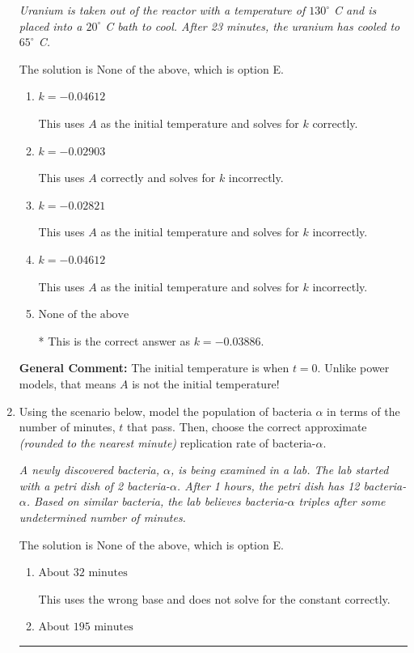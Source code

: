 \documentclass{extbook}[14pt]
\newcommand{\litem}[1]{\item #1

\rule{\textwidth}{0.4pt}}
\begin{document}
\begin{enumerate}
{\begin{center}
    \textit{ Uranium is taken out of the reactor with a temperature of $130^{\circ}$ C and is placed into a $20^{\circ}$ C bath to cool. After 23 minutes, the uranium has cooled to $65^{\circ}$ C. }
\end{center}


The solution is \( \text{None of the above} \), which is option E.\begin{enumerate}[label=\Alph*.]
\item \( k = -0.04612 \)

This uses $A$ as the initial temperature and solves for $k$ correctly.
\item \( k = -0.02903 \)

This uses $A$ correctly and solves for $k$ incorrectly.
\item \( k = -0.02821 \)

This uses $A$ as the initial temperature and solves for $k$ incorrectly.
\item \( k = -0.04612 \)

This uses $A$ as the initial temperature and solves for $k$ incorrectly.
\item \( \text{None of the above} \)

* This is the correct answer as $k = -0.03886$.
\end{enumerate}

\textbf{General Comment:} The initial temperature is when $t = 0$. Unlike power models, that means $A$ is not the initial temperature!
}
\litem{
Using the scenario below, model the population of bacteria $\alpha$ in terms of the number of minutes, $t$ that pass. Then, choose the correct approximate \textit{(rounded to the nearest minute)} replication rate of bacteria-$\alpha$.

\begin{center}
    \textit{ A newly discovered bacteria, $\alpha$, is being examined in a lab. The lab started with a petri dish of 2 bacteria-$\alpha$. After 1 hours, the petri dish has 12 bacteria-$\alpha$. Based on similar bacteria, the lab believes bacteria-$\alpha$ triples after some undetermined number of minutes. }
\end{center}


The solution is \( \text{None of the above} \), which is option E.\begin{enumerate}[label=\Alph*.]
\item \( \text{About } 32 \text{ minutes} \)

This uses the wrong base and does not solve for the constant correctly.
\item \( \text{About } 195 \text{ minutes} \)


\end{enumerate}}
\end{enumerate}
\end{document}
